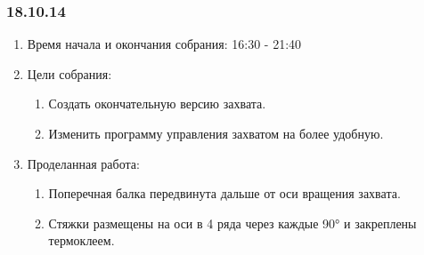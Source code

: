
\subsubsection{18.10.14}

\begin{enumerate}
	\item Время начала и окончания собрания:
	16:30 - 21:40
	\item Цели собрания:
	\begin{enumerate}
	  \item Создать окончательную версию захвата.
	  
	  \item Изменить программу управления захватом на более удобную.
	  
    \end{enumerate}
    
	\item Проделанная работа:
	\begin{enumerate}
	  \item Поперечная балка передвинута дальше от оси вращения захвата.
      
      \item Стяжки размещены на оси в 4 ряда через каждые 90° и закреплены термоклеем.
      

\end{enumerate}
\end{enumerate}
